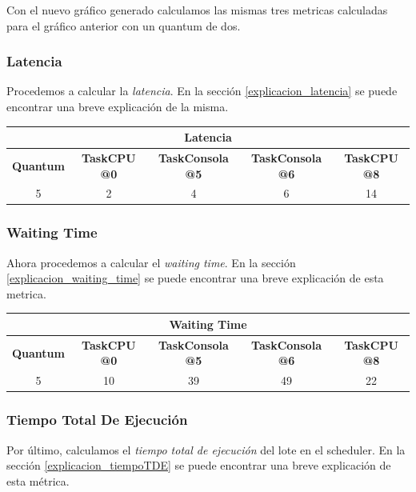 Con el nuevo gráfico generado calculamos las mismas tres metricas calculadas para el gráfico anterior con un quantum de dos.

\subsubsection{Latencia}

Procedemos a calcular la \emph{latencia}. En la sección \ref{explicacion_latencia} se puede encontrar una breve explicación de la misma.

\begin{center}
	\begin{tabular}{|c|c|c|c|c|}
		\hline
		\multicolumn{5}{|c|}{\large{\textbf{Latencia}}} \\
		\hline
		\textbf{Quantum} & \textbf{TaskCPU @0} & \textbf{TaskConsola @5} & \textbf{TaskConsola @6} & \textbf{TaskCPU @8} \\
		\hline
		5 & 2 & 4 & 6 & 14 \\
		\hline
	\end{tabular}
\end{center}

\subsubsection{Waiting Time}

Ahora procedemos a calcular el \emph{waiting time}. En la sección \ref{explicacion_waiting_time} se puede encontrar una breve explicación de esta metrica.

\begin{center}
	\begin{tabular}{|c|c|c|c|c|}
		\hline
		\multicolumn{5}{|c|}{\large{\textbf{Waiting Time}}} \\
		\hline
		\textbf{Quantum} & \textbf{TaskCPU @0} & \textbf{TaskConsola @5} & \textbf{TaskConsola @6} & \textbf{TaskCPU @8} \\
		\hline
		5 & 10 & 39 & 49 & 22 \\
		\hline
	\end{tabular}
\end{center}

\subsubsection{Tiempo Total De Ejecución}

Por último, calculamos el \emph{tiempo total de ejecución} del lote en el scheduler. En la sección \ref{explicacion_tiempoTDE} se puede encontrar una breve explicación de esta métrica.

